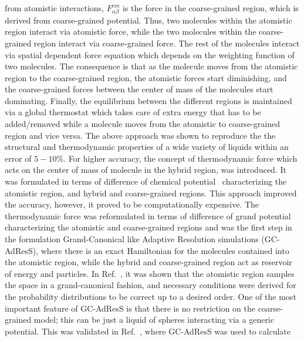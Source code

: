 \documentclass[a4paper,preprint,unsortedaddress]{revtex4-1}
\begin{document}
from atomistic interactions, $F_{\alpha\beta}^{cm}$ is the force in the coarse-grained region, which is derived from 
coarse-grained potential. Thus, two molecules within the atomistic region interact via atomistic force, while 
the two molecules within the coarse-grained region interact via coarse-grained force. The rest of the molecules 
interact via spatial dependent force equation which depends on the weighting function of two molecules. The consequence is that as the molecule 
moves from the atomistic region to the coarse-grained region, the atomistic forces start diminishing, and the coarse-grained 
forces between the center of mass of the molecules start dominating. Finally, the equilibrium between the different 
regions is maintained via a global thermostat which takes care of extra energy that has to be added/removed while 
a molecule moves from the atomistic to coarse-grained region and vice versa. The above approach was shown to reproduce the 
the structural and thermodynamic properties of a wide variety of liquids within an error of $5-10$\%. For 
higher accuracy, the concept of thermodynamic force which acts on the center of mass of molecule in the hybrid region, was introduced. 
It was formulated in terms of difference of chemical potential~\cite{adress5} characterizing the atomistic region, and hybrid and coarse-grained regions. 
This approach improved the accuracy, however, it proved to be computationally expensive. The thermodynamic force was 
reformulated in terms of difference of grand potential~\cite{prl2011,jctc-han} characterizing the atomistic and coarse-grained regions and was the first step in the formulation 
Grand-Canonical like Adaptive Resolution simulations (GC-AdResS), where there is an exact Hamiltonian for the molecules contained into the atomistic region, 
while the hybrid and coarse-grained region act as reservoir of energy and particles. In Ref.~\cite{prx-han}, it was shown that the atomistic region samples the 
space in a grand-canonical fashion, and necessary conditions were derived for the probability distributions to be correct up to 
a desired order. One of the most important feature of GC-AdResS is that there is no restriction on the coarse-grained model;  
this can be just a liquid of spheres interacting via a generic potential. This was validated in Ref.~\cite{jcp-anim}, where GC-AdResS was used to calculate
\end{document}
